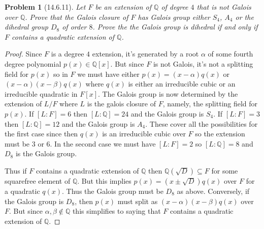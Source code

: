\documentclass{article}
\newtheorem{problem}{Problem}
\begin{document}
\begin{problem}[14.6.11]
Let $F$ be an extension of $\mathbb{Q}$ of degree $4$ that is not Galois over $\mathbb{Q}$. Prove that the Galois closure of $F$ has Galois group either $S_4$, $A_4$ or the dihedral group $D_8$ of order $8$. Prove the the Galois group is dihedral if and only if $F$ contains a quadratic extension of $\mathbb{Q}$.
\end{problem}
\begin{proof}
Since $F$ is a degree $4$ extension, it's generated by a root $\alpha$ of some fourth degree polynomial $p(x) \in \mathbb{Q}[x]$. But since $F$ is not Galois, it's not a splitting field for $p(x)$ so in $F$ we must have either $p(x) = (x-\alpha)q(x)$ or $(x-\alpha)(x-\beta)q(x)$ where $q(x)$ is either an irreducible cubic or an irreducible quadratic in $F[x]$. The Galois group is now determined by the extension of $L/F$ where $L$ is the galois closure of $F$, namely, the splitting field for $p(x)$. If $[L:F] = 6$ then $[L:\mathbb{Q}] = 24$ and the Galois group is $S_4$. If $[L:F] = 3$ then $[L:\mathbb{Q}] = 12$ and the Galois group is $A_4$. These cover all the possibilities for the first case since then $q(x)$ is an irreducible cubic over $F$ so the extension must be $3$ or $6$. In the second case we must have $[L:F] = 2$ so $[L:\mathbb{Q}] = 8$ and $D_8$ is the Galois group.

Thus if $F$ contains a quadratic extension of $\mathbb{Q}$ then $\mathbb{Q}(\sqrt{D}) \subseteq F$ for some squarefree element of $\mathbb{Q}$. But this implies $p(x) = (x \pm \sqrt{D})q(x)$ over $F$ for a quadratic $q(x)$. Thus the Galois group must be $D_8$ as above. Conversely, if the Galois group is $D_8$, then $p(x)$ must split as $(x-\alpha)(x-\beta)q(x)$ over $F$. But since $\alpha, \beta \notin \mathbb{Q}$ this simplifies to saying that $F$ contains a quadratic extension of $\mathbb{Q}$.
\end{proof}
\end{document}
